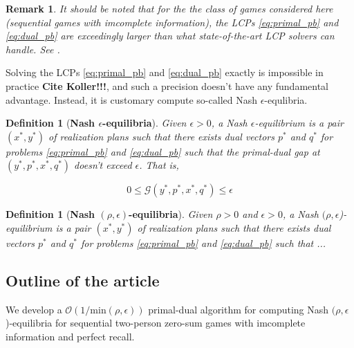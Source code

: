 \documentclass{article} %
\newtheorem{definition}[theorem]{Definition}
\newtheorem{remark}{Remark}
\begin{document}

\begin{remark}  
It should be noted that for the the class of games considered here (sequential games with imcomplete information), the LCPs \eqref{eq:primal_pb} and \eqref{eq:dual_pb} are exceedingly larger than what state-of-the-art LCP solvers can handle. See \cite{hoda2010smoothing}.
\end{remark}

Solving the LCPs \eqref{eq:primal_pb} and \eqref{eq:dual_pb} exactly is impossible in practice \textbf{Cite Koller!!!}, and such a precision doesn't have any fundamental advantage. Instead, it is customary compute so-called Nash $\epsilon$-equlibria.

\begin{definition}[\textbf{Nash $\epsilon$-equilibria}]
Given $\epsilon > 0$, a Nash $\epsilon$-equilibrium is
a pair $(x^*, y^*)$ of realization plans such that there exists dual
vectors $p^*$ and $q^*$ for problems \eqref{eq:primal_pb} and
\eqref{eq:dual_pb} such that the primal-dual gap at $(y^*, p^*, x^*, q^*)$
doesn't exceed $\epsilon$. That is,

\begin{equation}
  0 \le \mathcal{G}(y^*, p^*, x^*, q^*) \le \epsilon
\label{eq:approx_pb}
\end{equation}
\end{definition}

\begin{definition}[\textbf{Nash $(\rho,\epsilon)$-equilibria}]
Given $\rho > 0$ and $\epsilon > 0$, a Nash $(\rho,\epsilon$)-equilibrium is
a pair $(x^*, y^*)$ of realization plans such that there exists dual
vectors $p^*$ and $q^*$ for problems \eqref{eq:primal_pb} and
\eqref{eq:dual_pb} such that ...
\end{definition}

\subsection{Outline of the article}
We develop a $\mathcal{O}(1/\text{min}(\rho,\epsilon))$ primal-dual
algorithm for computing Nash $(\rho, \epsilon$)-equilibria for
sequential two-person zero-sum games with imcomplete information and
perfect recall.
\end{document}
